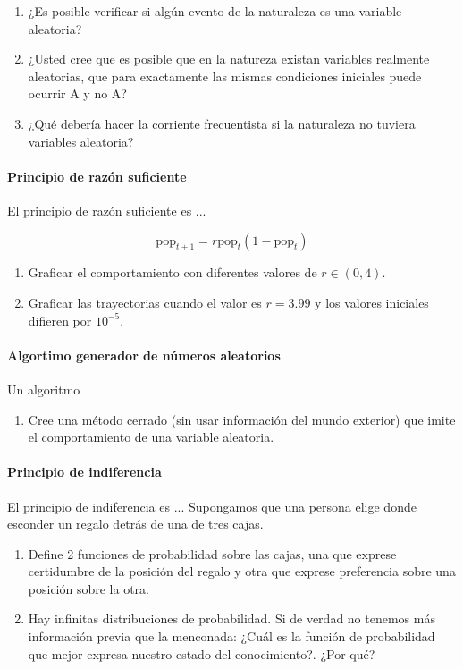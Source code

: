 \documentclass[a4paper,10pt]{article}
\begin{document}
\begin{enumerate}[resume]
\item ¿Es posible verificar si algún evento de la naturaleza es una variable aleatoria?
\item ¿Usted cree que es posible que en la natureza existan variables realmente aleatorias, que para exactamente las mismas condiciones iniciales puede ocurrir A y no A?
\item ¿Qué debería hacer la corriente frecuentista si la naturaleza no tuviera variables aleatoria? 
\end{enumerate}

\paragraph{Principio de razón suficiente} El principio de razón suficiente es ... 

\begin{equation}
\text{pop}_{t+1} = r \text{pop}_t (1-\text{pop}_t)
\end{equation}

\begin{enumerate}[resume]
\item Graficar el comportamiento con diferentes valores de $r \in (0,4)$.
\item Graficar las trayectorias cuando el valor es $r=3.99$ y los valores iniciales difieren por $10^{-5}$.
\end{enumerate}

\paragraph{Algortimo generador de números aleatorios} Un algoritmo 

\begin{enumerate}[resume]
\item Cree una método cerrado (sin usar información del mundo exterior) que imite el comportamiento de una variable aleatoria. 
\end{enumerate}

\paragraph{Principio de indiferencia} El principio de indiferencia es ...  Supongamos que una persona elige donde esconder un regalo detrás de una de tres cajas.

\begin{enumerate}
\item Define 2 funciones de probabilidad sobre las cajas, una que exprese certidumbre de la posición del regalo y otra que exprese preferencia sobre una posición sobre la otra.
\item Hay infinitas distribuciones de probabilidad. Si de verdad no tenemos más información previa que la menconada: ¿Cuál es la función de probabilidad que mejor expresa nuestro estado del conocimiento?. ¿Por qué?
\end{enumerate}
\end{document}
